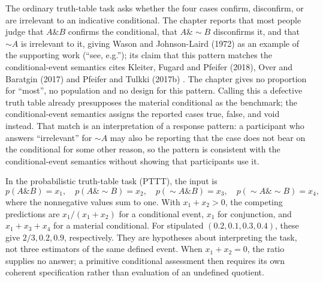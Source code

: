 The ordinary truth-table task asks whether the four cases confirm,
disconfirm, or are irrelevant to an indicative conditional. The chapter
reports that most people judge that \(A\mathbin{\&}B\) confirms the
conditional, that \(A\mathbin{\&}\sim B\) disconfirms it, and that
\(\sim A\) is irrelevant to it, giving Wason and Johnson-Laird (1972)
as an example of the supporting work (``see, e.g.''); its claim that
this pattern matches the conditional-event semantics cites Kleiter,
Fugard and Pfeifer (2018), Over and Baratgin (2017) and Pfeifer and
Tulkki (2017b) \cite[p.~278]{Pfeifer2021ProbabilityLogic}. The chapter
gives no proportion for ``most'', no population and no design for
this pattern.
Calling this a defective truth table already presupposes the material
conditional as the benchmark; the conditional-event semantics assigns
the reported cases true, false, and void instead. That match is an
interpretation of a response pattern: a participant who answers
``irrelevant'' for \(\sim A\) may also be reporting that the case
does not bear on the conditional for some other reason, so the pattern
is consistent with the conditional-event semantics without showing that
participants use it.

In the probabilistic truth-table task (PTTT), the input is
\[
 p(A\mathbin{\&}B)=x_1,\quad
 p(A\mathbin{\&}\sim B)=x_2,\quad
 p(\sim A\mathbin{\&}B)=x_3,\quad
 p(\sim A\mathbin{\&}\sim B)=x_4,
\]
where the nonnegative values sum to one. With \(x_1+x_2>0\), the
competing predictions are \(x_1/(x_1+x_2)\) for a conditional event,
\(x_1\) for conjunction, and \(x_1+x_3+x_4\) for a material
conditional. For stipulated \((0.2,0.1,0.3,0.4)\), these give
\(2/3,0.2,0.9\), respectively. They are hypotheses about interpreting
the task, not three estimators of the same defined event. When
\(x_1+x_2=0\), the ratio supplies no answer; a primitive conditional
assessment then requires its own coherent specification rather than
evaluation of an undefined quotient.

